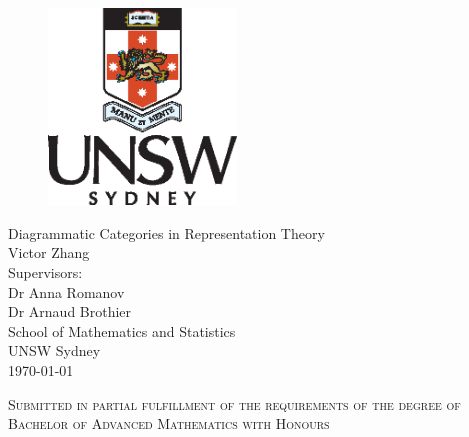 \documentclass[12pt]{report}
\begin{document}
\thispagestyle{empty} %
\begin{figure} \begin{center}
    \includegraphics[width=5cm]{start-files/2022-01-portraitcolourpos.eps}
    \end{center} \end{figure}
\vspace*{\fill}
\begin{center}
    {\LARGE
    Diagrammatic Categories in Representation Theory\\
    }
    \vspace{4em}
    {\large
    Victor Zhang\\
    }
    \vspace{1.5em}
    {\large
    {\normalsize Supervisors:}\\Dr Anna Romanov\\Dr Arnaud Brothier\\
    }
    \vspace{2em}
    School of Mathematics and Statistics\\UNSW Sydney
    \\ \vspace{3em}
    \monthyeardate\today
\end{center}
\vspace*{\fill}
\begin{center}
    \small\textsc{Submitted in partial fulfillment of the
    requirements of the degree of \\
    Bachelor of Advanced Mathematics with Honours}
\end{center}



\tableofcontents
\thispagestyle{empty}
\clearpage
\setcounter{page}{1}








\renewcommand{\bibname}{References}
\printbibliography[heading=bibintoc]
\end{document}
